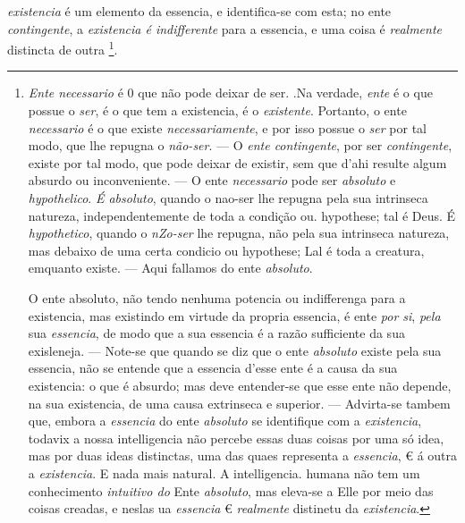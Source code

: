 \emph{existencia} é um elemento da essencia, e identifica-se com esta; no ente \emph{contingente}, a \emph{existencia é indifferente} para a essencia, e uma coisa é \emph{realmente} distincta de outra \footnote{\emph{Ente necessario} é 0 que não pode deixar de ser. .Na verdade, \emph{ente} é o que possue o \emph{ser}, é o que tem a existencia, é o \emph{existente}. Portanto, o ente \emph{necessario} é o que existe \emph{necessariamente}, e por isso possue o \emph{ser} por tal modo, que lhe repugna o \emph{não-ser}. --- O \emph{ente contingente}, por ser \emph{contingente}, existe por tal modo, que pode deixar de existir, sem que d'ahi resulte algum absurdo ou inconveniente. --- O ente \emph{necessario} pode ser \emph{absoluto} e \emph{hypothelico}. \emph{É absoluto}, quando o nao-ser lhe repugna pela sua intrinseca natureza, independentemente de toda a condição ou. hypothese; tal é Deus. É \emph{hypothetico}, quando o \emph{nZo-ser} lhe repugna, não pela sua intrinseca natureza, mas debaixo de uma certa condicio ou hypothese; Lal é toda a creatura, emquanto existe. --- Aqui fallamos do ente \emph{absoluto}.\par O ente absoluto, não tendo nenhuma potencia ou indifferenga para a existencia, mas existindo em virtude da propria essencia, é ente \emph{por si}, \emph{pela} sua \emph{essencia}, de modo que a sua essencia é a razão sufficiente da sua exisleneja. --- Note-se que quando se diz que o ente \emph{absoluto} existe pela sua essencia, não se entende que a essencia d'esse ente é a causa da sua existencia: o que é absurdo; mas deve entender-se que esse ente não depende, na sua existencia, de uma causa extrinseca e superior. --- Advirta-se tambem que, embora a \emph{essencia} do ente \emph{absoluto} se identifique com a \emph{existencia}, todavix a nossa intelligencia não percebe essas duas coisas por uma só idea, mas por duas ideas distinctas, uma das quaes representa a \emph{essencia}, € á outra a \emph{existencia}. E nada mais natural. A intelligencia. humana não tem um conhecimento \emph{intuitivo do} Ente \emph{absoluto}, mas eleva-se a Elle por meio das coisas creadas, e neslas ua \emph{essencia} € \emph{realmente} distinetu da \emph{existencia}.}.

